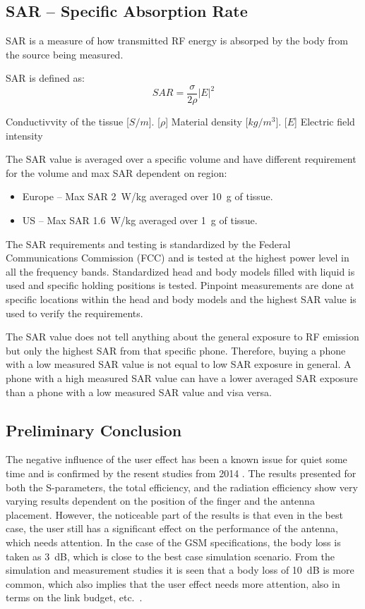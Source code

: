 \subsection{SAR -- Specific Absorption Rate}
SAR is a measure of how transmitted RF energy is absorped by the body from the source being measured.\cite{fcc2015sar} 

SAR is defined as\cite{fujimoto2008mobile}:
\begin{equation*}
  SAR = \frac{\sigma}{2\rho}|E|^2
\end{equation*}

\begin{where}
  [$\sigma$] Conductivvity of the tissue [$S/m$].
  [$\rho$] Material density [$kg/m^3$].
  [$E$] Electric field intensity
\end{where}

The SAR value is averaged over a specific volume and have different requirement for the volume and max SAR dependent on region:

\begin{itemize}
\item Europe -- Max SAR \SI{2}{W/kg} averaged over \SI{10}{g} of tissue.
\item US -- Max SAR \SI{1.6}{W/kg} averaged over \SI{1}{g} of tissue.
\end{itemize}

The SAR requirements and testing is standardized by the Federal Communications Commission (FCC) and is tested at the highest power level in all the frequency bands. Standardized head and body models filled with liquid is used and specific holding positions is tested. Pinpoint measurements are done at specific locations within the head and body models and the highest SAR value is used to verify the requirements.

The SAR value does not tell anything about the general exposure to RF emission but only the highest SAR from that specific phone. Therefore, buying a phone with a low measured SAR value is not equal to low SAR exposure in general. A phone with a high measured SAR value can have a lower averaged SAR exposure than a phone with a low measured SAR value and visa versa. 

\subsection{Preliminary Conclusion}
The negative influence of the user effect has been a known issue for quiet some time and is confirmed by the resent studies from 2014 \cite{Samantha2014UserEff}. The results presented for both the S-parameters, the total efficiency, and the radiation efficiency show very varying results dependent on the position of the finger and the antenna placement. However, the noticeable part of the results is that even in the best case, the user still has a significant effect on the performance of the antenna, which needs attention. In the case of the GSM specifications, the body loss is taken as \SI{3}{dB}, which is close to the best case simulation scenario. From the simulation and measurement studies it is seen that a body loss of \SI{10}{dB} is more common, which also implies that the user effect needs more attention, also in terms on the link budget, etc.\ \cite{sanchez2008multiband}.
